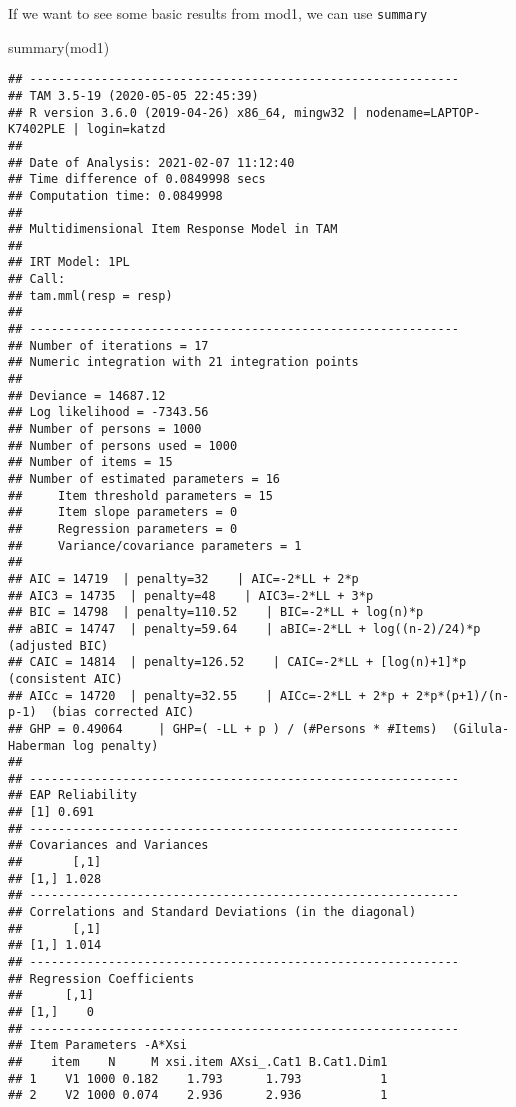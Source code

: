 \documentclass[
]{book}
\newenvironment{Shaded}{\begin{snugshade}}{\end{snugshade}}
\newcommand{\FunctionTok}[1]{\textcolor[rgb]{0.00,0.00,0.00}{#1}}
\newcommand{\NormalTok}[1]{#1}
\begin{document}
If we want to see some basic results from mod1, we can use \texttt{summary}

\begin{Shaded}
\begin{Highlighting}[]
\FunctionTok{summary}\NormalTok{(mod1)}
\end{Highlighting}
\end{Shaded}

\begin{verbatim}
## ------------------------------------------------------------
## TAM 3.5-19 (2020-05-05 22:45:39) 
## R version 3.6.0 (2019-04-26) x86_64, mingw32 | nodename=LAPTOP-K7402PLE | login=katzd 
## 
## Date of Analysis: 2021-02-07 11:12:40 
## Time difference of 0.0849998 secs
## Computation time: 0.0849998 
## 
## Multidimensional Item Response Model in TAM 
## 
## IRT Model: 1PL
## Call:
## tam.mml(resp = resp)
## 
## ------------------------------------------------------------
## Number of iterations = 17 
## Numeric integration with 21 integration points
## 
## Deviance = 14687.12 
## Log likelihood = -7343.56 
## Number of persons = 1000 
## Number of persons used = 1000 
## Number of items = 15 
## Number of estimated parameters = 16 
##     Item threshold parameters = 15 
##     Item slope parameters = 0 
##     Regression parameters = 0 
##     Variance/covariance parameters = 1 
## 
## AIC = 14719  | penalty=32    | AIC=-2*LL + 2*p 
## AIC3 = 14735  | penalty=48    | AIC3=-2*LL + 3*p 
## BIC = 14798  | penalty=110.52    | BIC=-2*LL + log(n)*p 
## aBIC = 14747  | penalty=59.64    | aBIC=-2*LL + log((n-2)/24)*p  (adjusted BIC) 
## CAIC = 14814  | penalty=126.52    | CAIC=-2*LL + [log(n)+1]*p  (consistent AIC) 
## AICc = 14720  | penalty=32.55    | AICc=-2*LL + 2*p + 2*p*(p+1)/(n-p-1)  (bias corrected AIC) 
## GHP = 0.49064     | GHP=( -LL + p ) / (#Persons * #Items)  (Gilula-Haberman log penalty) 
## 
## ------------------------------------------------------------
## EAP Reliability
## [1] 0.691
## ------------------------------------------------------------
## Covariances and Variances
##       [,1]
## [1,] 1.028
## ------------------------------------------------------------
## Correlations and Standard Deviations (in the diagonal)
##       [,1]
## [1,] 1.014
## ------------------------------------------------------------
## Regression Coefficients
##      [,1]
## [1,]    0
## ------------------------------------------------------------
## Item Parameters -A*Xsi
##    item    N     M xsi.item AXsi_.Cat1 B.Cat1.Dim1
## 1    V1 1000 0.182    1.793      1.793           1
## 2    V2 1000 0.074    2.936      2.936           1

\end{verbatim}
\end{document}
